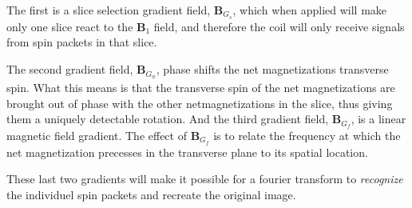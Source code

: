 The first is a slice selection gradient field, $\mathbf{B}_{G_s}$,
which when applied will make only one slice react to the
$\mathbf{B}_1$ field, and therefore the coil will only receive signals
from spin packets in that slice.

The second gradient field, $\mathbf{B}_{G_\phi}$, phase shifts the net
magnetizations transverse spin. What this means is that the transverse
spin of the net magnetizations are brought out of phase with the other
netmagnetizations in the slice, thus giving them a uniquely detectable
rotation. And the third gradient field, $\mathbf{B}_{G_f}$, is a
linear magnetic field gradient. The effect of $\mathbf{B}_{G_f}$ is to
relate the frequency at which the net magnetization precesses in the
transverse plane to its spatial location.

These last two gradients will make it possible for a fourier transform
to \emph{recognize} the individuel spin packets and recreate the original
image.

